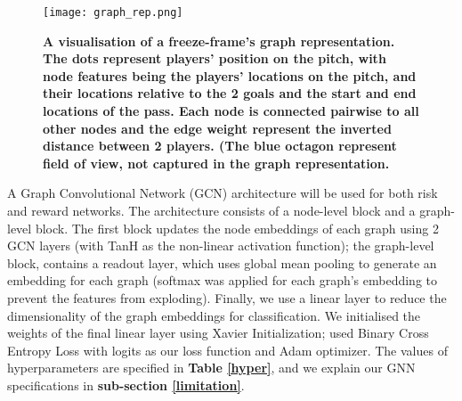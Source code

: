 \documentclass[conference]{IEEEtran}
\begin{document}
\begin{figure}[htbp]

\centerline{\texttt{[image: graph\_rep.png]}}
\caption{\textbf{A visualisation of a freeze-frame's graph representation. The dots represent players' position on the pitch, with node features being the players' locations on the pitch, and their locations relative to the 2 goals and the start and end locations of the pass. Each node is connected pairwise to all other nodes and the edge weight represent the inverted distance between 2 players. (The blue octagon represent field of view, not captured in the graph representation.}}
\label{risky_pass}
\end{figure}


A Graph Convolutional Network (GCN) architecture will be used for both risk and reward networks. The architecture consists of a node-level block and a graph-level block. The first block updates the node embeddings of each graph using 2 GCN layers (with TanH as the non-linear activation function); the graph-level block, contains a readout layer, which uses global mean pooling to generate an embedding for each graph (softmax was applied for each graph's embedding to prevent the features from exploding). Finally, we use a linear layer to reduce the dimensionality of the graph embeddings for classification. We initialised the weights of the final linear layer using Xavier Initialization; used Binary Cross Entropy Loss with logits as our loss function and Adam optimizer. The values of hyperparameters are specified in \textbf{Table \ref{hyper}}, and we explain our GNN specifications in \textbf{sub-section \ref{limitation}}.
\end{document}
